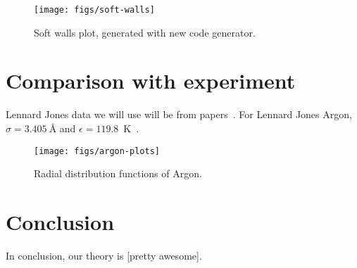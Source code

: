 \documentclass[letterpaper,twocolumn,amsmath,amssymb,prb]{revtex4-1}
\newcommand{\red}[1]{{\color{red} #1}}
\newcommand{\fixme}[1]{\red{[#1]}}
\begin{document}
\begin{figure}
  \texttt{[image: figs/soft-walls]}
  \caption{Soft walls plot, generated with new code generator.}
\label{fig:soft-walls}
\end{figure}

\section{Comparison with experiment}

Lennard Jones data we will use will be from
papers~\cite{mikolaj2004structure, eggert2002quantitative, yarnell1973structure}.
For Lennard Jones Argon, $\sigma = 3.405 ~\textrm{\AA}$ and $\epsilon = 119.8$~K~\cite{verlet1967computer}.
\begin{figure*}
  \begin{center}
    \texttt{[image: figs/argon-plots]}
  \end{center}
  \caption{Radial distribution functions of Argon.}
  \label{fig:argon-plots}
\end{figure*}

\section{Conclusion}

In conclusion, our theory is \fixme{pretty awesome}.

\end{document}
